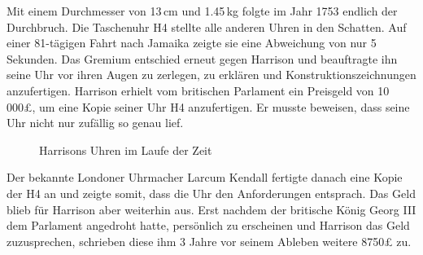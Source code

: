 \begin{refsection}
Mit einem Durchmesser von 13\,cm und 1.45\,kg folgte im Jahr 1753
endlich der Durchbruch.
Die Taschenuhr H4 stellte alle anderen Uhren in den Schatten. Auf
einer 81-tägigen Fahrt nach Jamaika zeigte sie eine Abweichung von
nur 5 Sekunden.
Das Gremium entschied erneut gegen Harrison und beauftragte ihn
seine Uhr vor ihren Augen zu zerlegen, zu erklären und
Konstruktionszeichnungen anzufertigen.
Harrison erhielt vom britischen Parlament ein Preisgeld von 10\,000£,
um eine Kopie seiner Uhr H4 anzufertigen. Er musste beweisen, dass
seine Uhr nicht nur zufällig so genau lief.
\begin{figure}[!htb]
\centering
\quad \quad
\centering
\quad \quad
\centering
\caption{Harrisons Uhren im Laufe der Zeit} 
\end{figure}

Der bekannte Londoner Uhrmacher Larcum Kendall fertigte danach eine
Kopie der H4 an und zeigte somit, dass die Uhr den Anforderungen
entsprach.
Das Geld blieb für Harrison aber weiterhin aus. Erst nachdem der
britische König Georg III dem Parlament angedroht hatte, persönlich
zu erscheinen und Harrison das Geld zuzusprechen, schrieben diese
ihm 3 Jahre vor seinem Ableben weitere 8750£ zu.


\end{refsection}
